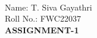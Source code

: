 \documentclass[10pt]{report}
\begin{document}
 \vspace{3mm}\\ \raggedright Name: T. Siva Gayathri\hspace{12cm}\\
\raggedleft Roll No.: FWC22037
\\ \centering \Large \textbf{ASSIGNMENT-1}\vspace{3mm}\normalsize\\ 
\end{document}
